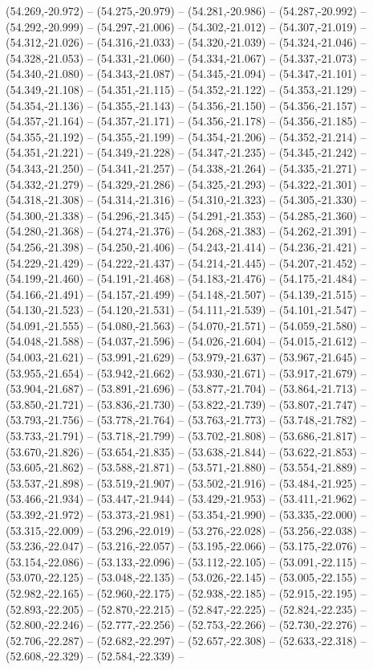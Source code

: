 (54.269,-20.972) -- (54.275,-20.979) -- (54.281,-20.986) -- (54.287,-20.992) -- (54.292,-20.999) -- (54.297,-21.006) -- (54.302,-21.012) -- (54.307,-21.019) -- (54.312,-21.026) -- (54.316,-21.033) -- (54.320,-21.039) -- (54.324,-21.046) -- (54.328,-21.053) -- (54.331,-21.060) -- (54.334,-21.067) -- (54.337,-21.073) -- (54.340,-21.080) -- (54.343,-21.087) -- (54.345,-21.094) -- (54.347,-21.101) -- (54.349,-21.108) -- (54.351,-21.115) -- (54.352,-21.122) -- (54.353,-21.129) -- (54.354,-21.136) -- (54.355,-21.143) -- (54.356,-21.150) -- (54.356,-21.157) -- (54.357,-21.164) -- (54.357,-21.171) -- (54.356,-21.178) -- (54.356,-21.185) -- (54.355,-21.192) -- (54.355,-21.199) -- (54.354,-21.206) -- (54.352,-21.214) -- (54.351,-21.221) -- (54.349,-21.228) -- (54.347,-21.235) -- (54.345,-21.242) -- (54.343,-21.250) -- (54.341,-21.257) -- (54.338,-21.264) -- (54.335,-21.271) -- (54.332,-21.279) -- (54.329,-21.286) -- (54.325,-21.293) -- (54.322,-21.301) -- (54.318,-21.308) -- (54.314,-21.316) -- (54.310,-21.323) -- (54.305,-21.330) -- (54.300,-21.338) -- (54.296,-21.345) -- (54.291,-21.353) -- (54.285,-21.360) -- (54.280,-21.368) -- (54.274,-21.376) -- (54.268,-21.383) -- (54.262,-21.391) -- (54.256,-21.398) -- (54.250,-21.406) -- (54.243,-21.414) -- (54.236,-21.421) -- (54.229,-21.429) -- (54.222,-21.437) -- (54.214,-21.445) -- (54.207,-21.452) -- (54.199,-21.460) -- (54.191,-21.468) -- (54.183,-21.476) -- (54.175,-21.484) -- (54.166,-21.491) -- (54.157,-21.499) -- (54.148,-21.507) -- (54.139,-21.515) -- (54.130,-21.523) -- (54.120,-21.531) -- (54.111,-21.539) -- (54.101,-21.547) -- (54.091,-21.555) -- (54.080,-21.563) -- (54.070,-21.571) -- (54.059,-21.580) -- (54.048,-21.588) -- (54.037,-21.596) -- (54.026,-21.604) -- (54.015,-21.612) -- (54.003,-21.621) -- (53.991,-21.629) -- (53.979,-21.637) -- (53.967,-21.645) -- (53.955,-21.654) -- (53.942,-21.662) -- (53.930,-21.671) -- (53.917,-21.679) -- (53.904,-21.687) -- (53.891,-21.696) -- (53.877,-21.704) -- (53.864,-21.713) -- (53.850,-21.721) -- (53.836,-21.730) -- (53.822,-21.739) -- (53.807,-21.747) -- (53.793,-21.756) -- (53.778,-21.764) -- (53.763,-21.773) -- (53.748,-21.782) -- (53.733,-21.791) -- (53.718,-21.799) -- (53.702,-21.808) -- (53.686,-21.817) -- (53.670,-21.826) -- (53.654,-21.835) -- (53.638,-21.844) -- (53.622,-21.853) -- (53.605,-21.862) -- (53.588,-21.871) -- (53.571,-21.880) -- (53.554,-21.889) -- (53.537,-21.898) -- (53.519,-21.907) -- (53.502,-21.916) -- (53.484,-21.925) -- (53.466,-21.934) -- (53.447,-21.944) -- (53.429,-21.953) -- (53.411,-21.962) -- (53.392,-21.972) -- (53.373,-21.981) -- (53.354,-21.990) -- (53.335,-22.000) -- (53.315,-22.009) -- (53.296,-22.019) -- (53.276,-22.028) -- (53.256,-22.038) -- (53.236,-22.047) -- (53.216,-22.057) -- (53.195,-22.066) -- (53.175,-22.076) -- (53.154,-22.086) -- (53.133,-22.096) -- (53.112,-22.105) -- (53.091,-22.115) -- (53.070,-22.125) -- (53.048,-22.135) -- (53.026,-22.145) -- (53.005,-22.155) -- (52.982,-22.165) -- (52.960,-22.175) -- (52.938,-22.185) -- (52.915,-22.195) -- (52.893,-22.205) -- (52.870,-22.215) -- (52.847,-22.225) -- (52.824,-22.235) -- (52.800,-22.246) -- (52.777,-22.256) -- (52.753,-22.266) -- (52.730,-22.276) -- (52.706,-22.287) -- (52.682,-22.297) -- (52.657,-22.308) -- (52.633,-22.318) -- (52.608,-22.329) -- (52.584,-22.339) -- 